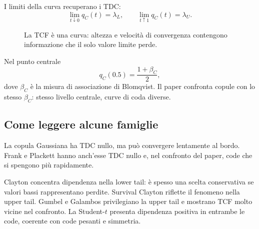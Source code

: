 \documentclass[11pt,a4paper]{article}
\begin{document}
I limiti della curva recuperano i TDC:
\[
 \lim_{t\downarrow0}q_C(t)=\lambda_L,
 \qquad
 \lim_{t\uparrow1}q_C(t)=\lambda_U.
\]

\begin{figure}[ht]
\centering
{}
\caption{La TCF è una curva: altezza e velocità di convergenza contengono informazione che il solo valore limite perde.}
\label{fig:tcf-reading}
\end{figure}

Nel punto centrale
\begin{equation}
 q_C(0.5)=\frac{1+\beta_C}{2},
 \label{eq:blomqvist}
\end{equation}
dove $\beta_C$ è la misura di associazione di Blomqvist. Il paper confronta
copule con lo stesso $\beta_C$: stesso livello centrale, curve di coda diverse.

\subsection{Come leggere alcune famiglie}

La copula Gaussiana ha TDC nullo, ma può convergere lentamente al bordo.
Frank e Plackett hanno anch'esse TDC nullo e, nel confronto del paper, code che
si spengono più rapidamente.

Clayton concentra dipendenza nella lower tail: è spesso una scelta conservativa
se valori bassi rappresentano perdite. Survival Clayton riflette il fenomeno
nella upper tail. Gumbel e Galambos privilegiano la upper tail e mostrano TCF
molto vicine nel confronto. La Student-$t$ presenta dipendenza positiva in
entrambe le code, coerente con code pesanti e simmetria.
\end{document}
